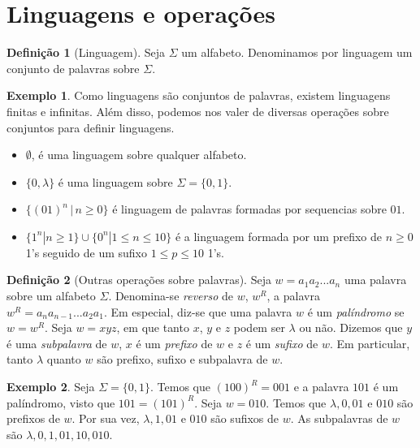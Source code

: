 \documentclass[a4paper]{article}
\theoremstyle{definition}
\newtheorem{Example}{Exemplo}
\newtheorem{Definition}{Definição}
\begin{document}
  \section{Linguagens e operações}

  \begin{Definition}[Linguagem]
    Seja $\Sigma$ um alfabeto. Denominamos por linguagem um conjunto de palavras
    sobre $\Sigma$. 
  \end{Definition}

  \begin{Example}
    Como linguagens são conjuntos de palavras, existem linguagens finitas e
    infinitas. Além disso, podemos nos valer de diversas operações sobre
    conjuntos para definir linguagens.
    \begin{itemize}
      \item $\emptyset$, é uma linguagem sobre qualquer alfabeto.
      \item $\{0, \lambda\}$ é uma linguagem sobre $\Sigma =\{0,1\}$.
      \item $\{(01)^n\,|\,n \geq 0\}$ é linguagem de palavras formadas por
        sequencias sobre $01$.
      \item $\{1^n| n \geq 1\} \cup \{0^n| 1 \leq n \leq 10\}$ é a linguagem
           formada por um prefixo de $n \geq 0$ 1's seguido de um sufixo $1 \leq
           p \leq 10$ 1's.
    \end{itemize}
  \end{Example}

  \begin{Definition}[Outras operações sobre palavras]
    Seja $w = a_1a_2...a_n$ uma palavra sobre um alfabeto $\Sigma$. Denomina-se
    \emph{reverso} de $w$, $w^R$, a palavra $w^R = a_n a_{n - 1}...a_2a_1$.
    Em especial, diz-se que uma palavra $w$ é um \emph{palíndromo} se
    $w = w^R$.  Seja $w = xyz$, em que tanto $x$, $y$ e $z$ podem ser $\lambda$
    ou não. Dizemos que $y$ é uma \emph{subpalavra} de $w$, $x$ é um
    \emph{prefixo} de $w$ e $z$ é um \emph{sufixo} de $w$. Em particular, tanto
    $\lambda$ quanto $w$ são prefixo, sufixo e subpalavra de $w$.
  \end{Definition}

  \begin{Example}
    Seja $\Sigma = \{0,1\}$. Temos que $(100)^R = 001$ e a palavra $101$ é um
    palíndromo, visto que $101 = (101)^R$. Seja $w = 010$. Temos que
    $\lambda, 0,01$ e $010$ são prefixos de $w$. Por sua vez,
    $\lambda,1, 01$ e $010$ são sufixos de $w$. As subpalavras de $w$ são
    $\lambda, 0, 1, 01, 10, 010$.
  \end{Example}
\end{document}
